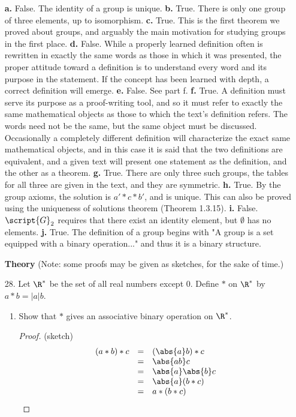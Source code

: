\documentclass[letterpaper]{article}
\begin{document}
\begin{enumerate}
\item[\phantom{25.}] 
	\textbf{a.} False. The identity of a group is unique. 
	\textbf{b.} True. There is only one group of three elements, up to isomorphism. 
	\textbf{c.} True. This is the first theorem we proved about groups, and arguably the main motivation for studying groups in the first place. 
	\textbf{d.} False. While a properly learned definition often is rewritten in exactly the same words as those in which it was presented, the proper attitude toward a definition is to understand every word and its purpose in the statement. If the concept has been learned with depth, a correct definition will emerge. 
	\textbf{e.} False. See part f. 
	\textbf{f.} True. A definition must serve its purpose as a proof-writing tool, and so it must refer to exactly the same mathematical objects as those to which the text's definition refers. The words need not be the same, but the same object must be discussed. Occasionally a completely different definition will characterize the exact same mathematical objects, and in this case it is said that the two definitions are equivalent, and a given text will present one statement as the definition, and the other as a theorem. 
	\textbf{g.} True. There are only three such groups, the tables for all three are given in the text, and they are symmetric. 
	\textbf{h.} True. By the group axioms, the solution is $a'*c*b'$, and is unique. This can also be proved using the uniqueness of solutions theorem (Theorem 1.3.15). 
	\textbf{i.} False. $\script{G}_2$ requires that there exist an identity element, but $\emptyset$ has no elements. 
	\textbf{j.} True. The definition of a group begins with "A group is a set equipped with a binary operation..." and thus it is a binary structure. 

\hspace*{-0.6cm}\textbf{Theory} (Note: some proofs may be given as sketches, for the sake of time.)

\item[28.] Let $\R^*$ be the set of all real numbers except 0. Define $*$ on $\R^*$ by $a*b=|a|b$. 
	\begin{enumerate}[label=\alph*.]
	\item Show that $*$ gives an associative binary operation on $\R^*$. 
	\begin{proof}(sketch)
	\[\begin{array}{rcl}
	(a*b)*c&=&(\abs{a}b)*c\\
	&=&\abs{ab}c\\
	&=&\abs{a}\abs{b}c\\
	&=&\abs{a}(b*c)\\
	&=&a*(b*c)\\
	\end{array}\]
	\end{proof}
	

\end{enumerate}
\end{enumerate}
\end{document}
